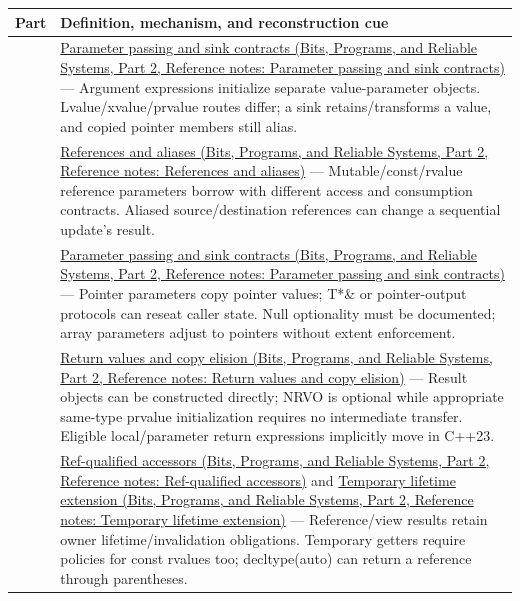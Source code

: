 {\def\LTcaptype{none} %
\begin{longtable}[]{@{}
  >{\raggedright\arraybackslash}p{}
  >{\raggedright\arraybackslash}p{}@{}}
\toprule\noalign{}
\begin{minipage}[b]{\linewidth}\raggedright
Part
\end{minipage} & \begin{minipage}[b]{\linewidth}\raggedright
Definition, mechanism, and reconstruction cue
\end{minipage} \\
\midrule\noalign{}
\endhead
\bottomrule\noalign{}
\endlastfoot
127 & \href{../01-Bits-Programs-and-Reliable-Systems-P02/main.pdf\#appendix-d5908f75721f}{Parameter passing and sink contracts (Bits, Programs, and Reliable Systems, Part 2, Reference notes: Parameter passing and sink contracts)} --- Argument expressions initialize separate value-parameter objects. Lvalue/xvalue/prvalue routes differ; a sink retains/transforms a value, and copied pointer members still alias. \\
128 & \href{../01-Bits-Programs-and-Reliable-Systems-P02/main.pdf\#appendix-d6d562ca9fbb}{References and aliases (Bits, Programs, and Reliable Systems, Part 2, Reference notes: References and aliases)} --- Mutable/const/rvalue reference parameters borrow with different access and consumption contracts. Aliased source/destination references can change a sequential update's result. \\
129 & \href{../01-Bits-Programs-and-Reliable-Systems-P02/main.pdf\#appendix-d5908f75721f}{Parameter passing and sink contracts (Bits, Programs, and Reliable Systems, Part 2, Reference notes: Parameter passing and sink contracts)} --- Pointer parameters copy pointer values; T*\& or pointer-output protocols can reseat caller state. Null optionality must be documented; array parameters adjust to pointers without extent enforcement. \\
130 & \href{../01-Bits-Programs-and-Reliable-Systems-P02/main.pdf\#appendix-b08d3788c5c6}{Return values and copy elision (Bits, Programs, and Reliable Systems, Part 2, Reference notes: Return values and copy elision)} --- Result objects can be constructed directly; NRVO is optional while appropriate same-type prvalue initialization requires no intermediate transfer. Eligible local/parameter return expressions implicitly move in C++23. \\
131 & \href{../01-Bits-Programs-and-Reliable-Systems-P02/main.pdf\#appendix-d42039b1d6f7}{Ref-qualified accessors (Bits, Programs, and Reliable Systems, Part 2, Reference notes: Ref-qualified accessors)} and \href{../01-Bits-Programs-and-Reliable-Systems-P02/main.pdf\#appendix-a978b29bbbb0}{Temporary lifetime extension (Bits, Programs, and Reliable Systems, Part 2, Reference notes: Temporary lifetime extension)} --- Reference/view results retain owner lifetime/invalidation obligations. Temporary getters require policies for const rvalues too; decltype(auto) can return a reference through parentheses. \\

\end{longtable}}
